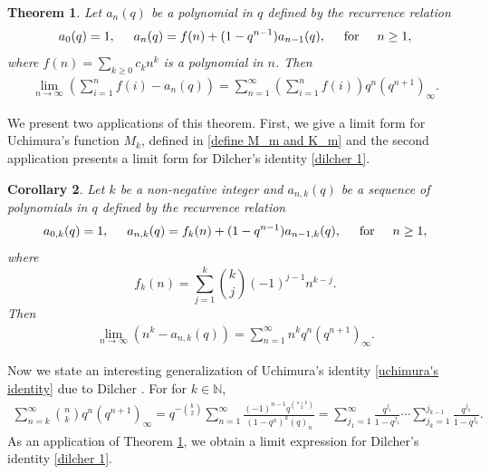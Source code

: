 \documentclass[11pt,reqno]{amsart}
\renewcommand{\(}{\left\(}
\renewcommand{\)}{\right\)}
\renewcommand{\[}{\left\[}
\renewcommand{\]}{\right\]}
\numberwithin{equation}{section}
\theoremstyle{plain}
\newtheorem{theorem}{Theorem}[section]
\newtheorem{corollary}[theorem]{Corollary}
\begin{document}
\begin{theorem}\label{new expression to Andrews Crippa Simon}
Let $a_n(q)$ be a polynomial in $q$ defined by the recurrence relation $$a_0(q)=1, \hspace{5mm}a_n(q)=f(n)+(1-q^{n-1})a_{n-1}(q),\hspace{5mm} \mathrm{for} \hspace{5mm} n\geq 1,$$ where $f(n)=\sum_{k\geq 0} c_k n^k$ is a polynomial in $n$. Then
\begin{align*}
\lim_{n\rightarrow \infty}\left(\sum_{i=1}^n f(i)-a_n(q)\right) = \sum_{n=1}^\infty \left(\sum_{i=1}^n f(i)\right)q^n(q^{n+1})_\infty.
\end{align*}
\end{theorem}
We present two applications of this theorem.  First, we give  a limit form for Uchimura's function $M_k$,  defined in  \eqref{define M_m and K_m} and the second application presents a limit form for Dilcher's identity \eqref{dilcher 1}.  
\begin{corollary}\label{a new term of limit to our generalization}
Let $k$ be a non-negative integer and $a_{n,k}(q)$ be a sequence of polynomials in $q$ defined by the recurrence relation 
\begin{align}\label{definition a_n,k}
a_{0,k}(q)=1, \hspace{5mm}a_{n,k}(q)=f_k(n)+(1-q^{n-1})a_{n-1,k}(q),\hspace{5mm} \mathrm{for} \hspace{5mm} n\geq 1,
\end{align}
where $$ f_k(n)=\sum_{j=1}^k {k \choose j}(-1)^{j-1}n^{k-j}. $$ Then
\begin{align*}
\lim_{n\rightarrow \infty}\left(n^k- a_{n,k}(q)\right) = \sum_{n=1}^\infty n^k q^n(q^{n+1})_\infty.
\end{align*}
\end{corollary}
Now we state  an interesting generalization of Uchimura's  identity \eqref{uchimura's identity} due to Dilcher \cite[Equations (4.3),(5.7)]{dilcher}.  For for $k\in \mathbb{N}$,
\begin{align}\label{dilcher 1}
\sum_{n=k}^\infty {n\choose k} q^n(q^{n+1})_\infty=q^{-{k\choose 2}}\sum_{n=1}^\infty \frac{(-1)^{n-1}q^{{n+k \choose 2}}}{(1-q^n)^k (q)_n}=\sum_{j_1=1}^\infty\frac{q^{j_1}}{1-q^{j_1}} \cdots \sum_{j_k=1}^{j_{k-1}}\frac{q^{j_k}}{1-q^{j_k}}.
\end{align}
As an application of Theorem \ref{new expression to Andrews Crippa Simon},  we obtain a limit expression for Dilcher's identity \eqref{dilcher 1}.  
\end{document}
